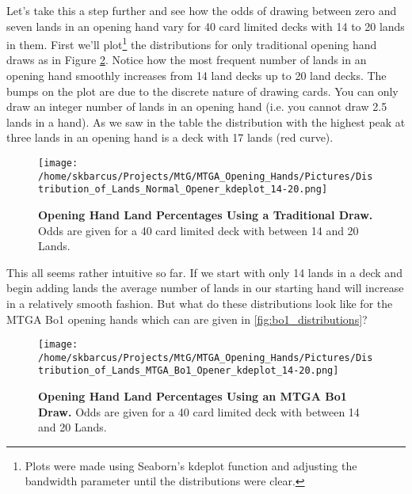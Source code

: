 \documentclass[oneside]{book}   %
\begin{document}
Let's take this a step further and see how the odds of drawing between zero and seven lands in an opening hand vary for 40 card limited decks with 14 to 20 lands in them. First we'll plot\footnote{Plots were made using Seaborn's kdeplot function and adjusting the bandwidth parameter until the distributions were clear.} the distributions for only traditional opening hand draws as in Figure \ref{fig:traditional_distributions}. Notice how the most frequent number of lands in an opening hand smoothly increases from 14 land decks up to 20 land decks. The bumps on the plot are due to the discrete nature of drawing cards. You can only draw an integer number of lands in an opening hand (i.e. you cannot draw 2.5 lands in a hand). As we saw in the table the distribution with the highest peak at three lands in an opening hand is a deck with 17 lands (red curve).

 	\begin{figure}[!ht]
	\centering
	\centerline{\texttt{[image: /home/skbarcus/Projects/MtG/MTGA\_Opening\_Hands/Pictures/Distribution\_of\_Lands\_Normal\_Opener\_kdeplot\_14-20.png]}}
	\caption{
	{\bf{Opening Hand Land Percentages Using a Traditional Draw.}} Odds are given for a 40 card limited deck with between 14 and 20 Lands.}
	\label{fig:traditional_distributions}
	\end{figure}	

This all seems rather intuitive so far. If we start with only 14 lands in a deck and begin adding lands the average number of lands in our starting hand will increase in a relatively smooth fashion. But what do these distributions look like for the MTGA Bo1 opening hands which can are given in \ref{fig:bo1_distributions}? 

 	\begin{figure}[!ht]
	\centering
	\centerline{\texttt{[image: /home/skbarcus/Projects/MtG/MTGA\_Opening\_Hands/Pictures/Distribution\_of\_Lands\_MTGA\_Bo1\_Opener\_kdeplot\_14-20.png]}}
	\caption{
	{\bf{Opening Hand Land Percentages Using an MTGA Bo1 Draw.}} Odds are given for a 40 card limited deck with between 14 and 20 Lands.}
	\label{fig:traditional_distributions}
	\end{figure}	



\end{document}
